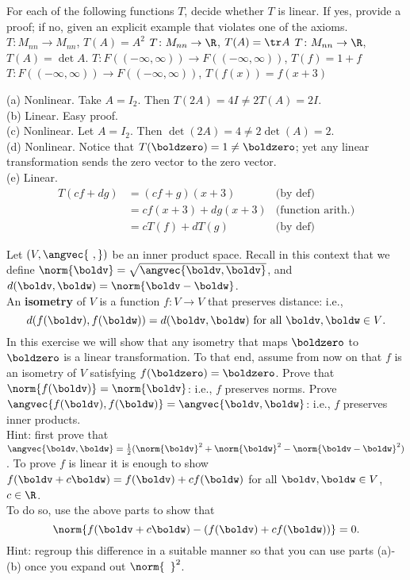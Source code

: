 \bb
\begin{samepage}
\ii For each of the following functions $T$, decide whether $T$ is linear. If yes, provide a proof; if no, given an explicit example that violates one of the axioms.  
\bb
\ii $T\colon M_{nn}\rightarrow M_{nn}$, $T(A)=A^2$ 
\ii $T\colon M_{nn}\rightarrow \R$, $T(A)=\tr A$
\ii $T\colon M_{nn}\rightarrow \R$, $T(A)=\det A$. 
\ii $T\colon F((-\infty, \infty))\rightarrow F((-\infty, \infty))$, $T(f)=1+f$
\ii $T\colon F((-\infty, \infty))\rightarrow F((-\infty, \infty))$, $T(f(x))=f(x+3)$
\ee
\end{samepage}
\begin{solution}
\noindent
(a) Nonlinear. Take $A=I_2$. Then $T(2A)=4I\ne 2T(A)=2I$. 
\\
(b) Linear. Easy proof. 
\\
(c) Nonlinear. Let $A=I_2$. Then $\det(2A)=4\ne 2\det(A)=2$. 
\\
(d) Nonlinear. Notice that $T(\boldzero)=1\ne\boldzero$; yet any linear transformation sends the zero vector to the zero vector. 
\\
(e) Linear. 
\begin{align*}
T(cf+dg)&=(cf+g)(x+3)&\text{(by def)}\\
&=cf(x+3)+dg(x+3)&\text{(function arith.)}\\
&=cT(f)+dT(g) &\text{(by def)}
\end{align*}
\end{solution}
\begin{samepage}
\ii Let $(V,\angvec{ \ , })$ be an inner product space. Recall in this context that we define $\norm{\boldv}=\sqrt{\angvec{\boldv, \boldv}}$, and $d(\boldv, \boldw)=\norm{\boldv-\boldw}$. 
\\
An {\bf isometry}  of $V$ is a function $f\colon V\rightarrow V$ that preserves distance: i.e., 
\[
d(f(\boldv), f(\boldw))=d(\boldv, \boldw) \text{ for all $\boldv, \boldw\in V$}.
\]
In this exercise we will show that any isometry that maps $\boldzero$ to $\boldzero$ is a linear transformation. To that end, assume from now on that $f$ is an isometry of $V$ satisfying $f(\boldzero)=\boldzero$.  
\bb
\ii Prove that $\norm{f(\boldv)}=\norm{\boldv}$: i.e., $f$ preserves norms. 
\ii Prove $\angvec{f(\boldv), f(\boldw)}=\angvec{\boldv, \boldw}$: i.e., $f$ preserves inner products. 
\\
Hint: first prove that $\angvec{\boldv, \boldw}=\frac{1}{2}(\norm{\boldv}^2+\norm{\boldw}^2-\norm{\boldv-\boldw}^2)$.
\ii To prove $f$ is linear it is enough to show $f(\boldv+c\boldw)=f(\boldv)+cf(\boldw)$ for all $\boldv, \boldw\in V$, $c\in \R$. \\
To do so, use the above parts to show that 
\[
\norm{f(\boldv+c\boldw)-(f(\boldv)+cf(\boldw))}=0.
\]  
\noindent
Hint: regroup this difference in a suitable manner so that you can use parts (a)-(b) once you expand out $\norm{\hspace{5pt}}^2$. 
\ee
\end{samepage}
